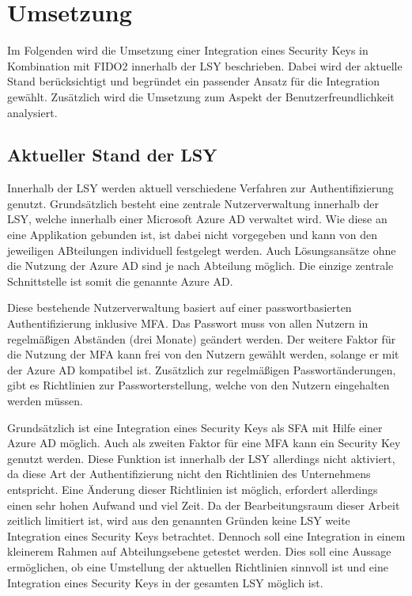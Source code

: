 \chapter{Umsetzung}

Im Folgenden wird die Umsetzung einer Integration eines Security Keys in Kombination mit \ac{FIDO}2 innerhalb der \ac{LSY} beschrieben. Dabei wird der aktuelle Stand berücksichtigt und begründet ein passender Ansatz für die Integration gewählt. Zusätzlich wird die Umsetzung zum Aspekt der Benutzerfreundlichkeit analysiert.

\section{Aktueller Stand der LSY}
Innerhalb der \ac{LSY} werden aktuell verschiedene Verfahren zur Authentifizierung genutzt. Grundsätzlich besteht eine zentrale Nutzerverwaltung innerhalb der \ac{LSY}, welche innerhalb einer Microsoft Azure \ac{AD} verwaltet wird. Wie diese an eine Applikation gebunden ist, ist dabei nicht vorgegeben und kann von den jeweiligen ABteilungen individuell festgelegt werden. Auch Lösungsansätze ohne die Nutzung der Azure \ac{AD} sind je nach Abteilung möglich. Die einzige zentrale Schnittstelle ist somit die genannte Azure \ac{AD}.

Diese bestehende Nutzerverwaltung basiert auf einer passwortbasierten Authentifizierung inklusive \ac{MFA}. Das Passwort muss von allen Nutzern in regelmäßigen Abständen (drei Monate) geändert werden. Der weitere Faktor für die Nutzung der \ac{MFA} kann frei von den Nutzern gewählt werden, solange er mit der Azure \ac{AD} kompatibel ist. Zusätzlich zur regelmäßigen Passwortänderungen, gibt es Richtlinien zur Passworterstellung, welche von den Nutzern eingehalten werden müssen. 

Grundsätzlich ist eine Integration eines Security Keys als \ac{SFA} mit Hilfe einer Azure \ac{AD} möglich. Auch als zweiten Faktor für eine \ac{MFA} kann ein Security Key genutzt werden. Diese Funktion ist innerhalb der \ac{LSY} allerdings nicht aktiviert, da diese Art der Authentifizierung nicht den Richtlinien des Unternehmens entspricht. Eine Änderung dieser Richtlinien ist möglich, erfordert allerdings einen sehr hohen Aufwand und viel Zeit. Da der Bearbeitungsraum dieser Arbeit zeitlich limitiert ist, wird aus den genannten Gründen keine \ac{LSY} weite Integration eines Security Keys betrachtet. Dennoch soll eine Integration in einem kleinerem Rahmen auf Abteilungsebene getestet werden. Dies soll eine Aussage ermöglichen, ob eine Umstellung der aktuellen Richtlinien sinnvoll ist und eine Integration eines Security Keys in der gesamten \ac{LSY} möglich ist.

